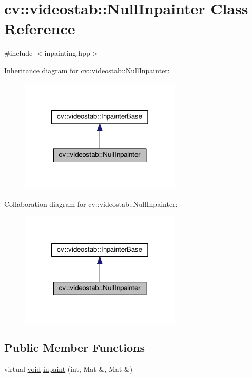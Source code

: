 \hypertarget{classcv_1_1videostab_1_1NullInpainter}{\section{cv\-:\-:videostab\-:\-:Null\-Inpainter Class Reference}
\label{classcv_1_1videostab_1_1NullInpainter}
}


{\ttfamily \#include $<$inpainting.\-hpp$>$}



Inheritance diagram for cv\-:\-:videostab\-:\-:Null\-Inpainter\-:\nopagebreak
\begin{figure}[H]
\begin{center}
\leavevmode
\includegraphics[width=220pt]{classcv_1_1videostab_1_1NullInpainter__inherit__graph}
\end{center}
\end{figure}


Collaboration diagram for cv\-:\-:videostab\-:\-:Null\-Inpainter\-:\nopagebreak
\begin{figure}[H]
\begin{center}
\leavevmode
\includegraphics[width=220pt]{classcv_1_1videostab_1_1NullInpainter__coll__graph}
\end{center}
\end{figure}
\subsection*{Public Member Functions}
\begin{DoxyCompactItemize}
\item 
virtual \hyperlink{legacy_8hpp_a8bb47f092d473522721002c86c13b94e}{void} \hyperlink{classcv_1_1videostab_1_1NullInpainter_a1ada205f1f65d8e0c841e5396604f155}{inpaint} (int, Mat \&, Mat \&)
\end{DoxyCompactItemize}
